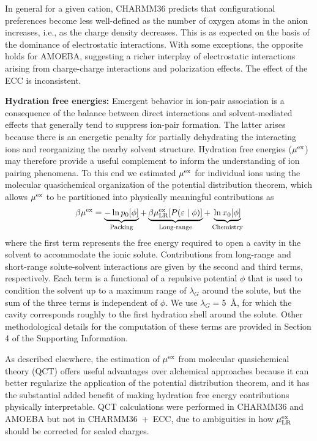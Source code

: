 \documentclass[journal=jpclcd,manuscript=article,articletitle=true,layout=twocolumn]{achemso}
\begin{document}
In general for a given cation, CHARMM36 predicts that configurational preferences become less well-defined as the number of oxygen atoms in the anion increases, i.e., as the charge density decreases. This is as expected on the basis of the dominance of electrostatic interactions.  With some exceptions, the opposite holds for AMOEBA, suggesting a richer interplay of electrostatic interactions arising from charge-charge interactions and polarization effects. The effect of the ECC is inconsistent. 


\textbf{Hydration free energies:} Emergent behavior in ion-pair association is a consequence of the balance between direct interactions and solvent-mediated effects that generally tend to suppress ion-pair formation. The latter arises because there is an energetic penalty for partially dehydrating the interacting ions and reorganizing the nearby solvent structure. Hydration free energies ($\mu^{\rm{ex}}$) may therefore provide a useful complement to inform the understanding of ion pairing phenomena. To this end we estimated $\mu^{\rm{ex}}$ for individual ions using the molecular quasichemical organization of the potential distribution theorem,\cite{Beck2006, Asthagiri2021b, Weber2011, Weber2012} which allows $\mu^{\rm{ex}}$ to be partitioned into physically meaningful contributions as
\begin{eqnarray}
\beta \mu^{\rm{ex}} = \underbrace{- \ln p_0[\phi]}_\text{Packing} + \underbrace{\beta\mu^{\rm{ex}}_{\rm{LR}}[P(\varepsilon \; | \; \phi)]}_\text{Long-range} + \underbrace{\ln x_0[\phi]}_\text{Chemistry}
\label{eq:mqct}
\end{eqnarray}
where the first term represents the free energy required to open a cavity in the solvent to accommodate the ionic solute. Contributions from long-range and short-range solute-solvent interactions are given by the second and third terms, respectively. Each term is a functional of a repulsive potential $\phi$ that is used to condition the solvent up to a maximum range of $\lambda_G$ around the solute, but the sum of the three terms is independent of $\phi$. We use $\lambda_G = 5$~{\AA}, for which the cavity corresponds roughly to the first hydration shell around the solute. Other methodological details for the computation of these terms are provided in Section 4 of the Supporting Information. 

As described elsewhere,\cite{Asthagiri2021b} the estimation of $\mu^{\rm{ex}}$ from molecular quasichemical theory (QCT) offers useful advantages over alchemical approaches because it can better regularize the application of the potential distribution theorem, and it has the substantial added benefit of making hydration free energy contributions physically interpretable. QCT calculations were performed in CHARMM36 and AMOEBA but not in CHARMM36~+~ECC, due to ambiguities in how $\mu^{\rm{ex}}_{\rm{LR}}$ should be corrected for scaled charges. 
 
\end{document}
